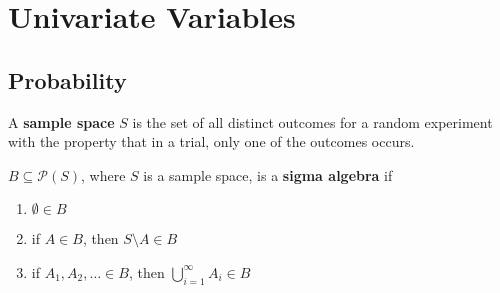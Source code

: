 \documentclass[11pt,fleqn]{book} %
\begin{document}


\pagestyle{empty} %

\tableofcontents %

\cleardoublepage %

\pagestyle{fancy} %





\chapter{Univariate Variables}

\section{Probability}

\begin{definition} 
A \textbf{sample space} \(S\) is the set of all distinct outcomes for a random experiment with the property that in a trial, only one of the outcomes occurs.
\end{definition}

\begin{definition} 
\(B \subseteq \mathcal{P}(S)\), where \(S\) is a sample space, is a \textbf{sigma algebra} if
\begin{enumerate}
\item \(\emptyset \in B\)
\item if \(A \in B\), then \(S \setminus A \in B \)
\item if \(A_1, A_2, \ldots \in B\), then \(\bigcup_{i=1}^\infty A_i \in B\)
\end{enumerate}
\end{definition}
\end{document}
